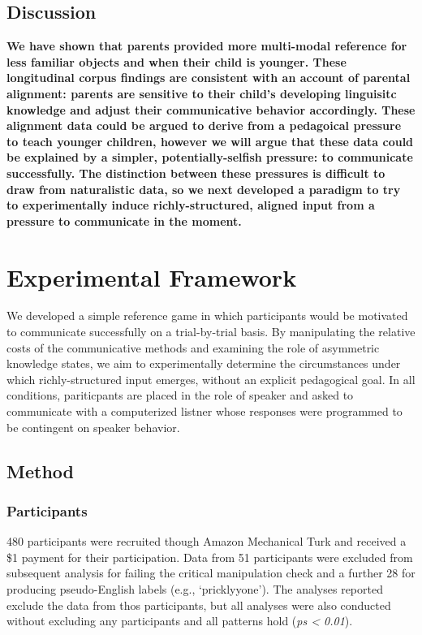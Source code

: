 \documentclass[10pt, letterpaper]{article}
\begin{document}
\subsection{Discussion}\label{discussion}

\textbf{We have shown that parents provided more multi-modal reference
for less familiar objects and when their child is younger. These
longitudinal corpus findings are consistent with an account of parental
alignment: parents are sensitive to their child's developing linguisitc
knowledge and adjust their communicative behavior accordingly. These
alignment data could be argued to derive from a pedagoical pressure to
teach younger children, however we will argue that these data could be
explained by a simpler, potentially-selfish pressure: to communicate
successfully. The distinction between these pressures is difficult to
draw from naturalistic data, so we next developed a paradigm to try to
experimentally induce richly-structured, aligned input from a pressure
to communicate in the moment.}

\section{Experimental Framework}\label{experimental-framework}

We developed a simple reference game in which participants would be
motivated to communicate successfully on a trial-by-trial basis. By
manipulating the relative costs of the communicative methods and
examining the role of asymmetric knowledge states, we aim to
experimentally determine the circumstances under which richly-structured
input emerges, without an explicit pedagogical goal. In all conditions,
pariticpants are placed in the role of speaker and asked to communicate
with a computerized listner whose responses were programmed to be
contingent on speaker behavior.

\subsection{Method}\label{method}

\subsubsection{Participants}\label{participants}

480 participants were recruited though Amazon Mechanical Turk and
received a \$1 payment for their participation. Data from 51
participants were excluded from subsequent analysis for failing the
critical manipulation check and a further 28 for producing
pseudo-English labels (e.g., `pricklyyone'). The analyses reported
exclude the data from thos participants, but all analyses were also
conducted without excluding any participants and all patterns hold
(\emph{ps \textless{} 0.01}).
\end{document}

